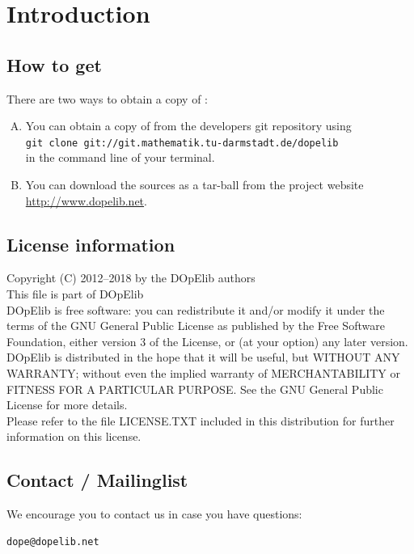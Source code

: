 \chapter{Introduction}\label{chap:intro}
\section{How to get \dope{}}\label{sec:obtain}
There are two ways to obtain a copy of \dope{}:\\

\begin{enumerate}[A)]
\item You can obtain a copy of \dope{} from the developers git repository using\\
\texttt{git clone git://git.mathematik.tu-darmstadt.de/dopelib} \\
in the command line of your terminal.


%
\item You can download the sources as a tar-ball from the project website\\ 
\url{http://www.dopelib.net}.
\end{enumerate}


\section{License information}
Copyright (C) 2012--2018 by the DOpElib authors\\[2mm]
%
This file is part of DOpElib\\[2mm]
%
DOpElib is free software: you can redistribute it
and/or modify it under the terms of the GNU General Public
License as published by the Free Software Foundation, either
version 3 of the License, or (at your option) any later
version.\\[2mm]
%
DOpElib is distributed in the hope that it will be
useful, but WITHOUT ANY WARRANTY; without even the implied
warranty of MERCHANTABILITY or FITNESS FOR A PARTICULAR
PURPOSE.  See the GNU General Public License for more
details.\\[2mm]
%
Please refer to the file LICENSE.TXT included in this distribution
for further information on this license.


\section{Contact / Mailinglist}
We encourage you to contact us in case you have questions:
\begin{verbatim}
dope@dopelib.net 
\end{verbatim}


